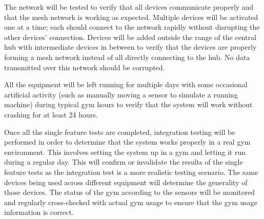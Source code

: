 \documentclass[PPFS.tex]{template/subfiles}
\begin{document}
The network will be tested to verify that all devices communicate properly and that the mesh network is working as expected. Multiple devices will be activated one at a time; each should connect to the network rapidly without disrupting the other devices' connection. Devices will be added outside the range of the central hub with intermediate devices in between to verify that the devices are properly forming a mesh network instead of all directly connecting to the hub. No data transmitted over this network should be corrupted.

All the equipment will be left running for multiple days with some occasional artificial activity (such as manually moving a sensor to simulate a running machine) during typical gym hours to verify that the system will work without crashing for at least 24 hours.

Once all the single feature tests are completed, integration testing will be performed in order to determine that the system works properly in a real gym environment. This involves setting the system up in a gym and letting it run during a regular day. This will confirm or invalidate the results of the single feature tests as the integration test is a more realistic testing scenario. The same devices being used across different equipment will determine the generality of those devices. The status of the gym according to the sensors will be monitored and regularly cross-checked with actual gym usage to ensure that the gym usage information is correct.
\end{document}
